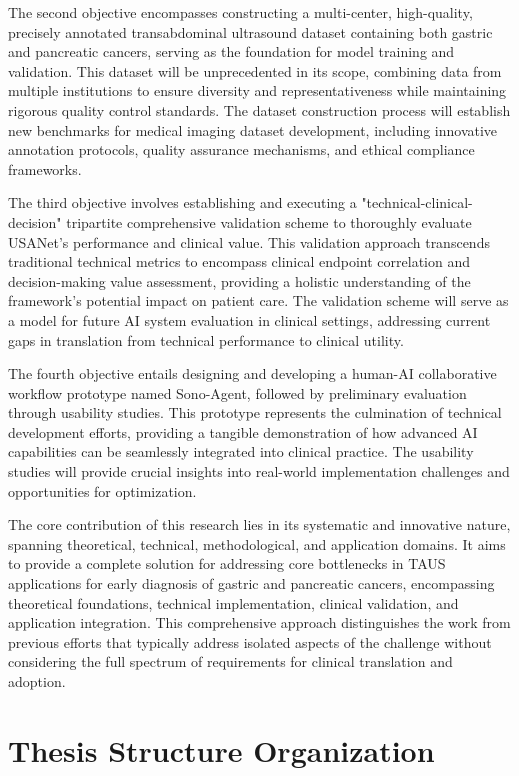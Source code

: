 The second objective encompasses constructing a multi-center, high-quality, precisely annotated transabdominal ultrasound dataset containing both gastric and pancreatic cancers, serving as the foundation for model training and validation. This dataset will be unprecedented in its scope, combining data from multiple institutions to ensure diversity and representativeness while maintaining rigorous quality control standards. The dataset construction process will establish new benchmarks for medical imaging dataset development, including innovative annotation protocols, quality assurance mechanisms, and ethical compliance frameworks.

The third objective involves establishing and executing a "technical-clinical-decision" tripartite comprehensive validation scheme to thoroughly evaluate USANet's performance and clinical value. This validation approach transcends traditional technical metrics to encompass clinical endpoint correlation and decision-making value assessment, providing a holistic understanding of the framework's potential impact on patient care. The validation scheme will serve as a model for future AI system evaluation in clinical settings, addressing current gaps in translation from technical performance to clinical utility.

The fourth objective entails designing and developing a human-AI collaborative workflow prototype named Sono-Agent, followed by preliminary evaluation through usability studies. This prototype represents the culmination of technical development efforts, providing a tangible demonstration of how advanced AI capabilities can be seamlessly integrated into clinical practice. The usability studies will provide crucial insights into real-world implementation challenges and opportunities for optimization.

The core contribution of this research lies in its systematic and innovative nature, spanning theoretical, technical, methodological, and application domains. It aims to provide a complete solution for addressing core bottlenecks in TAUS applications for early diagnosis of gastric and pancreatic cancers, encompassing theoretical foundations, technical implementation, clinical validation, and application integration. This comprehensive approach distinguishes the work from previous efforts that typically address isolated aspects of the challenge without considering the full spectrum of requirements for clinical translation and adoption.

\section{Thesis Structure Organization}

